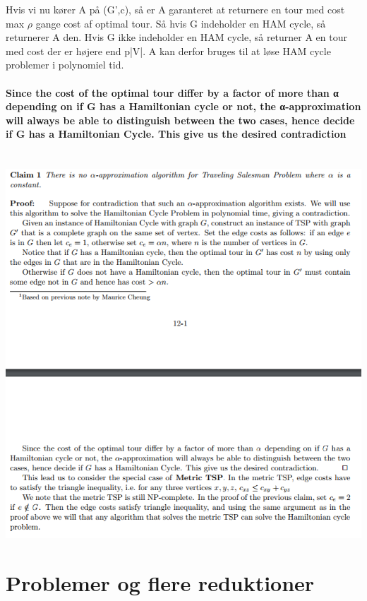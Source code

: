 \documentclass{article}
\begin{document}
Hvis vi nu kører A på (G',c), så er A garanteret at returnere en tour med cost max $\rho$ gange cost af optimal tour. Så hvis G indeholder en HAM cycle, så returnerer A den. Hvis G ikke indeholder en HAM cycle, så returner A en tour med cost der er højere end p|V|. A kan derfor bruges til at løse HAM cycle problemer i polynomiel tid.\\\\
\textbf{Since the cost of the optimal tour differ by a factor of more than α depending on if G has a
Hamiltonian cycle or not, the α-approximation will always be able to distinguish between the two
cases, hence decide if G has a Hamiltonian Cycle. This give us the desired contradiction}
\\\\\\
\includegraphics[scale=0.7]{sda}
\section{Problemer og flere reduktioner}

\end{document}
